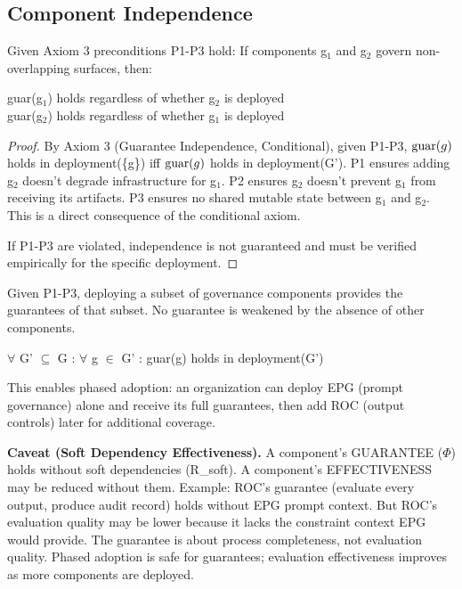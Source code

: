 \subsection{Component Independence}


\begin{clem}
Given Axiom 3 preconditions P1-P3 hold:
If components g$_1$ and g$_2$ govern non-overlapping surfaces, then:

\begin{claddisp}
guar(g$_1$) holds regardless of whether g$_2$ is deployed\\
guar(g$_2$) holds regardless of whether g$_1$ is deployed\\
\end{claddisp}
\end{clem}

\begin{proof}
By Axiom 3 (Guarantee Independence, Conditional), given P1-P3, $\operatorname{guar}(g)$ holds in deployment(\{g\}) iff $\operatorname{guar}(g)$ holds in deployment(G').
P1 ensures adding g$_2$ doesn't degrade infrastructure for g$_1$.
P2 ensures g$_2$ doesn't prevent g$_1$ from receiving its artifacts.
P3 ensures no shared mutable state between g$_1$ and g$_2$.
This is a direct consequence of the conditional axiom.

If P1-P3 are violated, independence is not guaranteed and must be verified empirically for the specific deployment.

\end{proof}

\begin{ccor}
Given P1-P3, deploying a subset of governance components provides the guarantees of that subset. No guarantee is weakened by the absence of other components.

\begin{claddisp}
$\forall$ G' $\subseteq$ G : $\forall$ g $\in$ G' : guar(g) holds in deployment(G')\\
\end{claddisp}
This enables phased adoption: an organization can deploy EPG (prompt governance) alone and receive its full guarantees, then add ROC (output controls) later for additional coverage.

\smallskip\noindent\textbf{Caveat (Soft Dependency Effectiveness).}
A component's GUARANTEE ($\Phi$) holds without soft dependencies (R\_\allowbreak{}soft).
A component's EFFECTIVENESS may be reduced without them. Example:
ROC's guarantee (evaluate every output, produce audit record) holds without EPG prompt context. But ROC's evaluation quality may be lower because it lacks the constraint context EPG would provide. The guarantee is about process completeness, not evaluation quality.
Phased adoption is safe for guarantees; evaluation effectiveness improves as more components are deployed.

\end{ccor}






